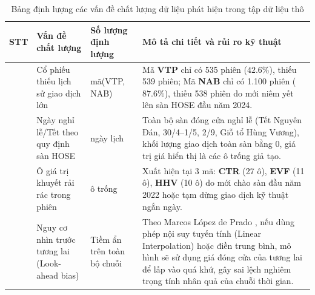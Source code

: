 \documentclass[12pt,a4paper,oneside,openany]{report}
\begin{document}
\begin{table}[H]
  \centering
  \caption{Bảng định lượng các vấn đề chất lượng dữ liệu phát hiện trong tập dữ liệu thô}
  \label{tab:chatluong}
  \begin{tabularx}{\textwidth}{|>{\centering\arraybackslash}p{1cm}|p{3.2cm}|>{\centering\arraybackslash}p{2.6cm}|X|}
    \hline
    \rowcolor{black!8}\textbf{STT} & \textbf{Vấn đề chất lượng} & \textbf{Số lượng định lượng} & \textbf{Mô tả chi tiết và rủi ro kỹ thuật} \\ \hline
    1 & Cổ phiếu thiếu lịch sử giao dịch lớn & 2 mã\newline (VTP, NAB) & Mã \textbf{VTP} chỉ có 535 phiên ($42.6\%$), thiếu 539 phiên; Mã \textbf{NAB} chỉ có 1.100 phiên ($87.6\%$), thiếu 538 phiên do mới niêm yết lên sàn HOSE đầu năm 2024. \\ \hline
    2 & Ngày nghỉ lễ/Tết theo quy định sàn HOSE & 68 ngày lịch & Toàn bộ sàn đóng cửa nghỉ lễ (Tết Nguyên Đán, 30/4--1/5, 2/9, Giỗ tổ Hùng Vương), khối lượng giao dịch toàn sàn bằng 0, giá trị giá hiển thị là các ô trống giả tạo. \\ \hline
    3 & Ô giá trị khuyết rải rác trong phiên & 48 ô trống & Xuất hiện tại 3 mã: \textbf{CTR} (27 ô), \textbf{EVF} (11 ô), \textbf{HHV} (10 ô) do mới chào sàn đầu năm 2022 hoặc tạm dừng giao dịch kỹ thuật ngắn ngày. \\ \hline
    4 & Nguy cơ nhìn trước tương lai (Look-ahead bias) & Tiềm ẩn trên toàn bộ chuỗi & Theo Marcos López de Prado \cite{lopezdeprado2018}, nếu dùng phép nội suy tuyến tính (Linear Interpolation) hoặc điền trung bình, mô hình sẽ sử dụng giá đóng cửa của tương lai để lấp vào quá khứ, gây sai lệch nghiêm trọng tính nhân quả của chuỗi thời gian. \\ \hline
  \end{tabularx}
\end{table}
\end{document}
